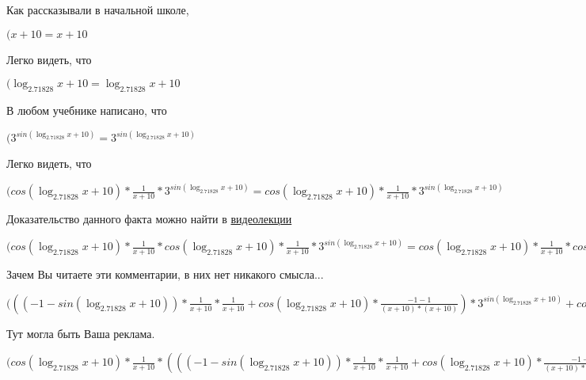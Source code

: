 \documentclass[12pt,a4paper,fleqn]{article}
\theoremstyle{definition}
\begin{document}
Как рассказывали в начальной школе,

$( x  +  10  =  x  +  10 $

Легко видеть, что

$(\log_{ 2.71828 }{ x  +  10 } = \log_{ 2.71828 }{ x  +  10 }$

В любом учебнике написано, что

$({ 3 }^{sin(\log_{ 2.71828 }{ x  +  10 })} = { 3 }^{sin(\log_{ 2.71828 }{ x  +  10 })}$

Легко видеть, что

$(cos(\log_{ 2.71828 }{ x  +  10 }) * \frac{ 1 }{ x  +  10 }
 * { 3 }^{sin(\log_{ 2.71828 }{ x  +  10 })} = cos(\log_{ 2.71828 }{ x  +  10 }) * \frac{ 1 }{ x  +  10 }
 * { 3 }^{sin(\log_{ 2.71828 }{ x  +  10 })}$

Доказательство данного факта можно найти в \href{https://www.youtube.com/watch?v=dQw4w9WgXcQ}{видеолекции}

$(cos(\log_{ 2.71828 }{ x  +  10 }) * \frac{ 1 }{ x  +  10 }
 * cos(\log_{ 2.71828 }{ x  +  10 }) * \frac{ 1 }{ x  +  10 }
 * { 3 }^{sin(\log_{ 2.71828 }{ x  +  10 })} = cos(\log_{ 2.71828 }{ x  +  10 }) * \frac{ 1 }{ x  +  10 }
 * cos(\log_{ 2.71828 }{ x  +  10 }) * \frac{ 1 }{ x  +  10 }
 * { 3 }^{sin(\log_{ 2.71828 }{ x  +  10 })}$

Зачем Вы читаете эти комментарии, в них нет никакого смысла...

$((( -1  - sin(\log_{ 2.71828 }{ x  +  10 })) * \frac{ 1 }{ x  +  10 }
 * \frac{ 1 }{ x  +  10 }
 + cos(\log_{ 2.71828 }{ x  +  10 }) * \frac{ -1  -  1 }{( x  +  10 ) * ( x  +  10 )}
) * { 3 }^{sin(\log_{ 2.71828 }{ x  +  10 })} + cos(\log_{ 2.71828 }{ x  +  10 }) * \frac{ 1 }{ x  +  10 }
 * cos(\log_{ 2.71828 }{ x  +  10 }) * \frac{ 1 }{ x  +  10 }
 * { 3 }^{sin(\log_{ 2.71828 }{ x  +  10 })} = (( -1  - sin(\log_{ 2.71828 }{ x  +  10 })) * \frac{ 1 }{ x  +  10 }
 * \frac{ 1 }{ x  +  10 }
 + cos(\log_{ 2.71828 }{ x  +  10 }) * \frac{ -1  -  1 }{( x  +  10 ) * ( x  +  10 )}
) * { 3 }^{sin(\log_{ 2.71828 }{ x  +  10 })} + cos(\log_{ 2.71828 }{ x  +  10 }) * \frac{ 1 }{ x  +  10 }
 * cos(\log_{ 2.71828 }{ x  +  10 }) * \frac{ 1 }{ x  +  10 }
 * { 3 }^{sin(\log_{ 2.71828 }{ x  +  10 })}$

Тут могла быть Ваша реклама.

$(cos(\log_{ 2.71828 }{ x  +  10 }) * \frac{ 1 }{ x  +  10 }
 * ((( -1  - sin(\log_{ 2.71828 }{ x  +  10 })) * \frac{ 1 }{ x  +  10 }
 * \frac{ 1 }{ x  +  10 }
 + cos(\log_{ 2.71828 }{ x  +  10 }) * \frac{ -1  -  1 }{( x  +  10 ) * ( x  +  10 )}
) * { 3 }^{sin(\log_{ 2.71828 }{ x  +  10 })} + cos(\log_{ 2.71828 }{ x  +  10 }) * \frac{ 1 }{ x  +  10 }
 * cos(\log_{ 2.71828 }{ x  +  10 }) * \frac{ 1 }{ x  +  10 }
 * { 3 }^{sin(\log_{ 2.71828 }{ x  +  10 })}) = cos(\log_{ 2.71828 }{ x  +  10 }) * \frac{ 1 }{ x  +  10 }
 * ((( -1  - sin(\log_{ 2.71828 }{ x  +  10 })) * \frac{ 1 }{ x  +  10 }
 * \frac{ 1 }{ x  +  10 }
 + cos(\log_{ 2.71828 }{ x  +  10 }) * \frac{ -1  -  1 }{( x  +  10 ) * ( x  +  10 )}
) * { 3 }^{sin(\log_{ 2.71828 }{ x  +  10 })} + cos(\log_{ 2.71828 }{ x  +  10 }) * \frac{ 1 }{ x  +  10 }
 * cos(\log_{ 2.71828 }{ x  +  10 }) * \frac{ 1 }{ x  +  10 }
 * { 3 }^{sin(\log_{ 2.71828 }{ x  +  10 })})$
\end{document}
